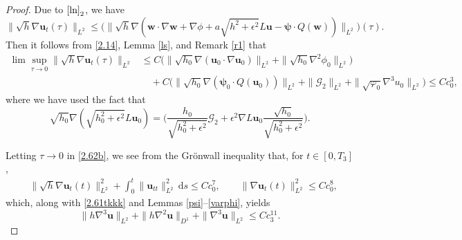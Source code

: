 \documentclass[11pt,reqno]{amsart}
\numberwithin{rk}{section}
\numberwithin{prop}{section}
\numberwithin{mydef}{section}
\numberwithin{lem}{section}
\numberwithin{equation}{section}
\numberwithin{thm}{section}
\begin{document}
\begin{proof}
Due to  $\eqref{ln}_2$, we have
\begin{equation*} 
\|\sqrt{h}\nabla \boldsymbol{u}_t(\tau)\|_{L^2} \leq \big(\|\sqrt{h}\nabla(\boldsymbol{w}\cdot \nabla \boldsymbol{w}+\nabla\phi+a\sqrt {h^2+\epsilon^2} L\boldsymbol{u} -\boldsymbol{\psi}\cdot Q(\boldsymbol{w}))\|_{L^2}\big)(\tau). 
\end{equation*}
Then it follows from \eqref{2.14}, Lemma \ref{ls}, and Remark \ref{r1} that 
\begin{equation*}
\begin{aligned}
\lim\sup_{\tau\to 0}\|\sqrt{h}\nabla \boldsymbol{u}_t(\tau)\|_{L^2}
& \leq  C\big(\|\sqrt{h_0}\nabla(\boldsymbol{u}_0\cdot\nabla \boldsymbol{u}_0)\|_{L^2}+\|\sqrt{h_0}\nabla^2\phi_0\|_{L^2}\big)\\
&\quad +C\big(\|\sqrt{h_0}\nabla(\boldsymbol{\psi}_0 \cdot  Q(\boldsymbol{u}_0))\|_{L^2} +\|\mathcal{G}_2\|_{L^2}+ \|\sqrt{\varphi_0}\nabla^3 u_0\|_{L^2}\big)
 \leq Cc^{3}_0,
\end{aligned}
\end{equation*}
where we have used the fact that 
\begin{equation*}
\sqrt{h_0}\nabla(\sqrt{h_0^2+\epsilon^2} L\boldsymbol{u}_0)=\Big(\frac{h_0}{\sqrt{h_0^2+\epsilon^2}}\mathcal{G}_2+\epsilon^2\nabla L\boldsymbol{u}_0\frac{\sqrt{h_0}}{\sqrt{h_0^2+\epsilon^2}}\Big).
\end{equation*}



Letting $\tau\to 0$ in \eqref{2.62b}, we see from the Gr\"onwall inequality that, for $t\in [0, T_3]$,
\begin{equation}\label{2.62m}\begin{aligned}
&\|\sqrt h\nabla \boldsymbol{u}_t(t)\|_{L^2}^2+\int^t_0\|\boldsymbol{u}_{tt}\|^2_{L^2}\,\mathrm{d}s\leq Cc^7_0,\qquad  \|\nabla \boldsymbol{u}_t(t)\|^2_{L^2}\leq Cc^8_0,
\end{aligned}
\end{equation}
which, along with \eqref{2.61tkkk} and Lemmas \ref{psi}--\ref{varphi}, yields  
\begin{equation}\label{2.63}
\|h\nabla^3\boldsymbol{u}\|_{L^2}+\|h\nabla^2\boldsymbol{u}\|_{D^1}+\|\nabla^3\boldsymbol{u}\|_{L^2}\leq Cc^{11}_3.
\end{equation}


\end{proof}
\end{document}
